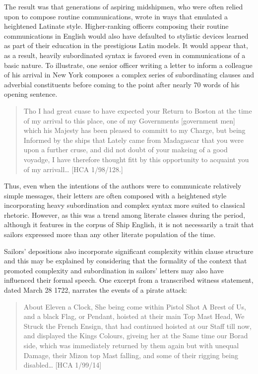 The result was that generations of aspiring midshipmen, who were often relied upon to compose routine communications, wrote in ways that emulated a heightened Latinate style. Higher-ranking officers composing their routine communications in English would also have defaulted to stylistic devices learned as part of their education in the prestigious Latin models. It would appear that, as a result, heavily subordinated syntax is favored even in communications of a basic nature. To illustrate, one senior officer writing a letter to inform a colleague of his arrival in New York composes a complex series of subordinating clauses and adverbial constituents before coming to the point after nearly 70 words of his opening sentence.

\begin{quotation}
Tho I had great cuase to have expected your Return to Boston at the time of my arrival to this place, one of my Governments [government men] which his Majesty has been pleased to committ to my Charge, but being Informed by the ships that Lately came from Madagascar that you were upon a further cruse, and did not doubt of your makeing of a good voyadge, I have therefore thought fitt by this opportunity to acquaint you of my arrivall… [HCA 1/98/128.]\end{quotation}

Thus, even when the intentions of the authors were to communicate relatively simple messages, their letters are often composed with a heightened style incorporating heavy subordination and complex syntax more suited to classical rhetoric. However, as this was a trend among literate classes during the period, although it features in the corpus of Ship English, it is not necessarily a trait that sailors expressed more than any other literate population of the time. 

  Sailors’ depositions also incorporate significant complexity within clause structure and this may be explained by considering that the formality of the context that promoted complexity and subordination in sailors’ letters may also have influenced their formal speech.  One excerpt from a transcribed witness statement, dated March 28 1722, narrates the events of a pirate attack:

\begin{quotation}
About Eleven a Clock, She being come within Pistol Shot A Brest of Us, and a black Flag, or Pendant, hoisted at their main Top Mast Head, We Struck the French Ensign, that had continued hoisted at our Staff till now, and displayed the Kings Colours, giveing her at the Same time our Borad side, which was immediately returned by them again but with unequal Damage, their Mizon top Mast falling, and some of their rigging being disabled… [HCA 1/99/14] \end{quotation}

